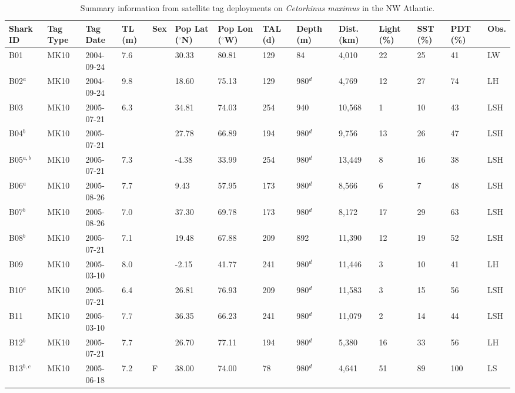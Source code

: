 \clearpage
\begin{table}[t!]
\caption{Summary information from satellite tag deployments on \textit{Cetorhinus maximus} in the NW Atlantic.}
\label{tab:c3t1}
\centering
\scriptsize
\begin{tabular}{p{.75cm} p{.85cm} p{1.5cm} p{.5cm} p{.5cm} p{.75cm} p{.75cm} p{.5cm} p{.75cm} p{.75cm} p{.5cm} p{.5cm} p{.5cm} p{.5cm}}
\toprule
\textbf{Shark ID} & \textbf{Tag Type} & \textbf{Tag Date} & \textbf{TL (m)} & \textbf{Sex} & \textbf{Pop Lat ($^{\circ}$N)} & \textbf{Pop Lon ($^{\circ}$W)} & \textbf{TAL (d)} & \textbf{Depth (m)} & \textbf{Dist. (km)} & \textbf{Light (\%)} & \textbf{SST (\%)} & \textbf{PDT (\%)} & \textbf{Obs.}\\
\midrule
B01 & MK10 & 2004-09-24 & 7.6 &  & 30.33 & 80.81 & 129 & 84 & 4,010 & 22 & 25 & 41 & LW\\
B02$^a$ & MK10 & 2004-09-24 & 9.8 &  & 18.60 & 75.13 & 129 & 980$^d$ & 4,769 & 12 & 27 & 74 & LH\\
B03 & MK10 & 2005-07-21 & 6.3 &  & 34.81 & 74.03 & 254 & 940 & 10,568 & 1 & 10 & 43 & LSH\\
B04$^b$ & MK10 & 2005-07-21 &  &  & 27.78 & 66.89 & 194 & 980$^d$ & 9,756 & 13 & 26 & 47 & LSH\\
B05$^{a,b}$ & MK10 & 2005-07-21 & 7.3 &  & -4.38 & 33.99 & 254 & 980$^d$ & 13,449 & 8 & 16 & 38 & LSH\\
B06$^a$ & MK10 & 2005-08-26 & 7.7 &  & 9.43 & 57.95 & 173 & 980$^d$ & 8,566 & 6 & 7 & 48 & LSH\\
B07$^b$ & MK10 & 2005-08-26 & 7.0 &  & 37.30 & 69.78 & 173 & 980$^d$ & 8,172 & 17 & 29 & 63 & LSH\\
B08$^b$ & MK10 & 2005-07-21 & 7.1 &  & 19.48 & 67.88 & 209 & 892 & 11,390 & 12 & 19 & 52 & LSH\\
B09 & MK10 & 2005-03-10 & 8.0 &  & -2.15 & 41.77 & 241 & 980$^d$ & 11,446 & 3 & 10 & 41 & LH\\
B10$^a$ & MK10 & 2005-07-21 & 6.4 &  & 26.81 & 76.93 & 209 & 980$^d$ & 11,583 & 3 & 15 & 56 & LSH\\
B11 & MK10 & 2005-03-10 & 7.7 &  & 36.35 & 66.23 & 241 & 980$^d$ & 11,079 & 2 & 14 & 44 & LSH\\
B12$^b$ & MK10 & 2005-07-21 & 7.7 &  & 26.70 & 77.11 & 194 & 980$^d$ & 5,380 & 16 & 33 & 56 & LH\\
B13$^{b,c}$ & MK10 & 2005-06-18 & 7.2 & F & 38.00 & 74.00 & 78 & 980$^d$ & 4,641 & 51 & 89 & 100 & LS\\

\end{tabular}
\end{table}
